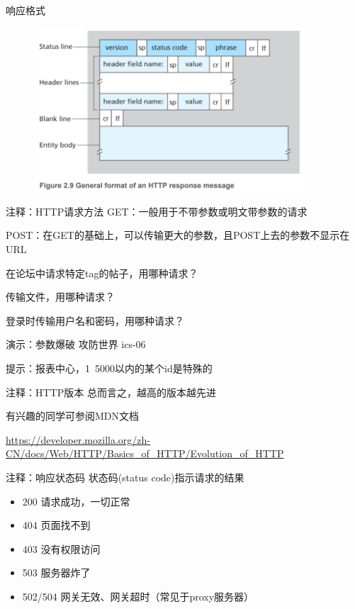 \documentclass[UTF8]{ctexbeamer}
\begin{document}
\begin{frame}{响应格式}
    \begin{figure}
        \centering
        \includegraphics[width=0.9\textwidth]{http-response.png}
    \end{figure}
\end{frame}

\begin{frame}{注释：HTTP请求方法}
GET：一般用于不带参数或明文带参数的请求

POST：在GET的基础上，可以传输更大的参数，且POST上去的参数不显示在 URL

\vspace{1em}

在论坛中请求特定tag的帖子，用哪种请求？

传输文件，用哪种请求？

登录时传输用户名和密码，用哪种请求？

\end{frame}

\begin{frame}{演示：参数爆破}
    攻防世界 ics-06

    提示：报表中心，1~5000以内的某个id是特殊的

\end{frame}

\begin{frame}{注释：HTTP版本}
    总而言之，越高的版本越先进

    有兴趣的同学可参阅MDN文档

    \url{https://developer.mozilla.org/zh-CN/docs/Web/HTTP/Basics_of_HTTP/Evolution_of_HTTP}

\end{frame}

\begin{frame}{注释：响应状态码}
    状态码(status code)指示请求的结果
    
    \begin{itemize}
        \item 200 请求成功，一切正常
        \item 404 页面找不到
        \item 403 没有权限访问
        \item 503 服务器炸了
        \item 502/504 网关无效、网关超时（常见于proxy服务器）
    \end{itemize}
\end{frame}
\end{document}

